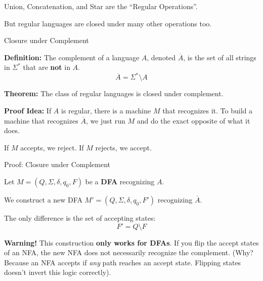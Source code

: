 \documentclass[10pt,aspectratio=169]{beamer}
\begin{document}
\begin{frame}[standout]
Union, Concatenation, and Star are the ``Regular Operations''.

But regular languages are closed under many other operations too.
\end{frame}

\begin{frame}{Closure under Complement}

\textbf{Definition:} The complement of a language $A$, denoted $\overline{A}$, is the set of all strings in $\Sigma^*$ that are \textbf{not} in $A$.
\[
\overline{A} = \Sigma^* \setminus A
\]

\vspace{1em}
\textbf{Theorem:} The class of regular languages is closed under complement.

\vspace{1em}
\pause
\textbf{Proof Idea:} 
If $A$ is regular, there is a machine $M$ that recognizes it. To build a machine that recognizes $\overline{A}$, we just run $M$ and do the exact opposite of what it does.

If $M$ accepts, we reject. If $M$ rejects, we accept.

\end{frame}

\begin{frame}{Proof: Closure under Complement}

Let $M = (Q, \Sigma, \delta, q_0, F)$ be a \textbf{DFA} recognizing $A$.

\vspace{1em}

We construct a new DFA $M' = (Q, \Sigma, \delta, q_0, F')$ recognizing $\overline{A}$.

\vspace{1em}

The only difference is the set of accepting states:
\[
F' = Q \setminus F
\]

\vspace{1em}
\pause
\textbf{Warning!} This construction \textbf{only works for DFAs}. 
If you flip the accept states of an NFA, the new NFA does not necessarily recognize the complement. (Why? Because an NFA accepts if \textit{any} path reaches an accept state. Flipping states doesn't invert this logic correctly).

\end{frame}
\end{document}
